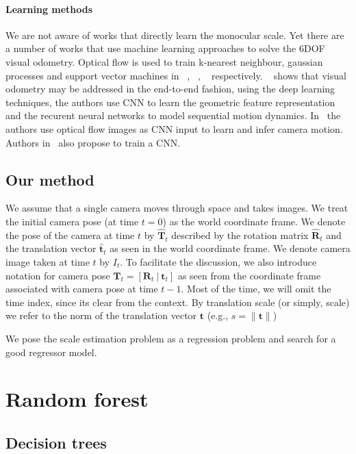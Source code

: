\paragraph{Learning methods} We are not aware of works that directly
learn the monocular scale. Yet there are a number of works that use
machine learning approaches to solve the 6DOF visual odometry.
Optical flow is used to train k-nearest neighbour, gaussian processes
and support vector machines in ~\cite{roberts2008memory},
~\cite{guizilini2013semi}, ~\cite{CIARFUGLIA20141717}
respectively. ~\cite{wang2017deepvo} shows that visual odometry may be
addressed in the end-to-end fashion, using the deep learning
techniques, the authors use CNN to learn the geometric feature
representation and the recurent neural networks to model sequential
motion dynamics. In~\cite{muller2017flowdometry} the authors use
optical flow images as CNN input to learn and infer camera
motion. Authors in~\cite{DBLP:journals/corr/MohantyADGSC16} also
propose to train a CNN.

\subsection{Our method}

We assume that a single camera moves through space and takes images.
We treat the initial camera pose (at time $t=0$) as the world
coordinate frame.  We denote the pose of the camera at time $t$ by
$\mathbf{\hat{T}}_t$ described by the rotation matrix
$\mathbf{\hat{R}}_t$ and the translation vector $\mathbf{\hat{t}}_t$
as seen in the world coordinate frame.  We denote camera image taken
at time $t$ by $I_t$.  To facilitate the discussion, we also introduce
notation for camera pose
$\mathbf{T}_t = [\mathbf{R}_t\ |\ \mathbf{t}_t] $ as seen from the
coordinate frame associated with camera pose at time $t-1$.  Most of
the time, we will omit the time index, since its clear from the
context.  By translation scale (or simply, scale) we refer to the norm
of the translation vector $\mathbf{t}$ (e.g.,
$s = \lVert \mathbf{t} \rVert$)

We pose the scale estimation problem as a regression problem and
search for a good regressor model.

\section{Random forest}

\subsection{Decision trees}

